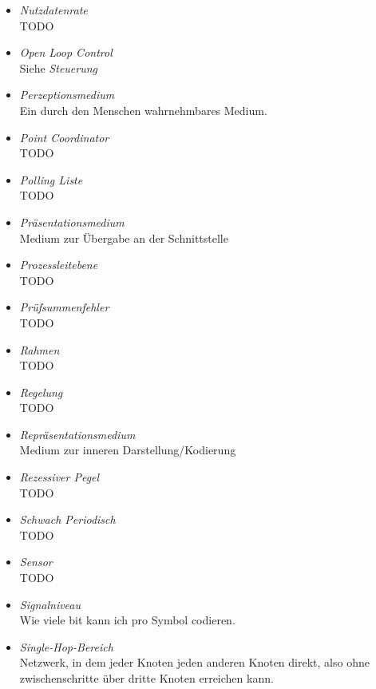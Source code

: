 \documentclass{article}
\begin{document}
\begin{itemize}
	\item \emph{Nutzdatenrate}\\
		TODO
	
	\item \emph{Open Loop Control}\\
		Siehe \emph{Steuerung}

	\item \emph{Perzeptionsmedium}\\
		Ein durch den Menschen wahrnehmbares Medium.

	\item \emph{Point Coordinator}\\
		TODO

	\item \emph{Polling Liste}\\
		TODO

	\item \emph{Präsentationsmedium}\\
		Medium zur Übergabe an der Schnittstelle

	\item \emph{Prozessleitebene}\\
		TODO

	\item \emph{Prüfsummenfehler}\\
		TODO

	\item \emph{Rahmen}\\
		TODO

	\item \emph{Regelung}\\
		TODO

	\item \emph{Repräsentationsmedium}\\
		Medium zur inneren Darstellung/Kodierung
	
	\item \emph{Rezessiver Pegel}\\
		TODO

	\item \emph{Schwach Periodisch}\\
		TODO

	\item \emph{Sensor}\\
		TODO

	\item \emph{Signalniveau}\\
		Wie viele bit kann ich pro Symbol codieren.

	\item \emph{Single-Hop-Bereich}\\
		Netzwerk, in dem jeder Knoten jeden anderen Knoten direkt, also ohne zwischenschritte über dritte Knoten erreichen kann.


\end{itemize}
\end{document}
